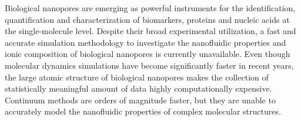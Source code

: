 \documentclass[journal=ancac3,manuscript=article,etalmode=truncate,maxauthors=0,layout=onecolumn]{achemso}
\begin{document}
\begin{abstract}
\end{abstract}



Biological nanopores are emerging as powerful instruments for the identification, quantification and characterization of biomarkers, proteins and nucleic acids at the single-molecule level. 
Despite their broad experimental utilization, a fast and accurate simulation methodology to investigate the nanofluidic properties and ionic composition of biological nanopores is currently unavailable. Even though molecular dynamics simulations have become significantly faster in recent years, the large atomic structure of biological nanopores makes the collection of statistically meaningful amount of data highly computationally expensive. Continuum methods are orders of magnitude faster, but they are unable to accurately model the nanofluidic properties of complex molecular structures.
\end{document}
